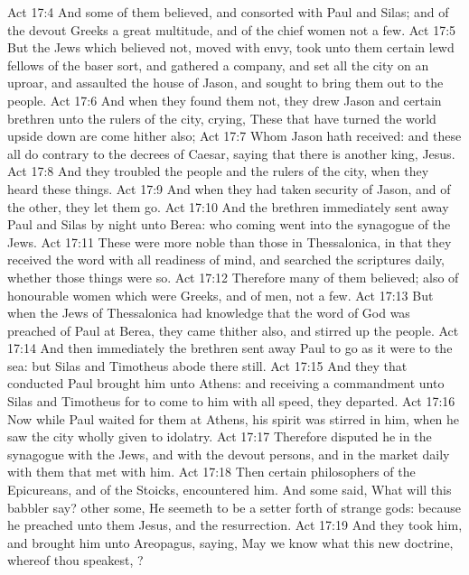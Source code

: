 \vs Act 17:4 And some of them believed, and consorted with Paul and Silas; and of the devout Greeks a great multitude, and of the chief women not a few.
\vs Act 17:5 But the Jews which believed not, moved with envy, took unto them certain lewd fellows of the baser sort, and gathered a company, and set all the city on an uproar, and assaulted the house of Jason, and sought to bring them out to the people.
\vs Act 17:6 And when they found them not, they drew Jason and certain brethren unto the rulers of the city, crying, These that have turned the world upside down are come hither also;
\vs Act 17:7 Whom Jason hath received: and these all do contrary to the decrees of Caesar, saying that there is another king,  Jesus.
\vs Act 17:8 And they troubled the people and the rulers of the city, when they heard these things.
\vs Act 17:9 And when they had taken security of Jason, and of the other, they let them go.
\vs Act 17:10 And the brethren immediately sent away Paul and Silas by night unto Berea: who coming  went into the synagogue of the Jews.
\vs Act 17:11 These were more noble than those in Thessalonica, in that they received the word with all readiness of mind, and searched the scriptures daily, whether those things were so.
\vs Act 17:12 Therefore many of them believed; also of honourable women which were Greeks, and of men, not a few.
\vs Act 17:13 But when the Jews of Thessalonica had knowledge that the word of God was preached of Paul at Berea, they came thither also, and stirred up the people.
\vs Act 17:14 And then immediately the brethren sent away Paul to go as it were to the sea: but Silas and Timotheus abode there still.
\vs Act 17:15 And they that conducted Paul brought him unto Athens: and receiving a commandment unto Silas and Timotheus for to come to him with all speed, they departed.
\vs Act 17:16 Now while Paul waited for them at Athens, his spirit was stirred in him, when he saw the city wholly given to idolatry.
\vs Act 17:17 Therefore disputed he in the synagogue with the Jews, and with the devout persons, and in the market daily with them that met with him.
\vs Act 17:18 Then certain philosophers of the Epicureans, and of the Stoicks, encountered him. And some said, What will this babbler say? other some, He seemeth to be a setter forth of strange gods: because he preached unto them Jesus, and the resurrection.
\vs Act 17:19 And they took him, and brought him unto Areopagus, saying, May we know what this new doctrine, whereof thou speakest, ?

